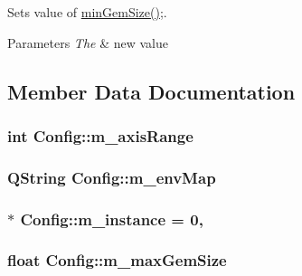 Sets value of \hyperlink{class_config_a26688d51537cbea3ee27810b3f6d1568}{min\+Gem\+Size()};. 


\begin{DoxyParams}{Parameters}
{\em The} & new value \\
\hline
\end{DoxyParams}


\subsection{Member Data Documentation}
\hypertarget{class_config_a5f172b706977841fdcb91351eeae817e}{}
\subsubsection[{m\+\_\+axis\+Range}]{\setlength{\rightskip}{0pt plus 5cm}int Config\+::m\+\_\+axis\+Range\hspace{0.3cm}{\ttfamily [protected]}}\label{class_config_a5f172b706977841fdcb91351eeae817e}
\hypertarget{class_config_a70804accd579749b776f9c0c3e5c000b}{}
\subsubsection[{m\+\_\+env\+Map}]{\setlength{\rightskip}{0pt plus 5cm}Q\+String Config\+::m\+\_\+env\+Map\hspace{0.3cm}{\ttfamily [protected]}}\label{class_config_a70804accd579749b776f9c0c3e5c000b}
\hypertarget{class_config_af8e6282b4a10e5bce08419395394581b}{}
\subsubsection[{m\+\_\+instance}]{ $\ast$ Config\+::m\+\_\+instance = 0\hspace{0.3cm}{\ttfamily [static]}, {\ttfamily [protected]}}\label{class_config_af8e6282b4a10e5bce08419395394581b}
\hypertarget{class_config_ae8a0c3906a4d18952a7fbb00868c963e}{}
\subsubsection[{m\+\_\+max\+Gem\+Size}]{\setlength{\rightskip}{0pt plus 5cm}float Config\+::m\+\_\+max\+Gem\+Size\hspace{0.3cm}{\ttfamily [protected]}}\label{class_config_ae8a0c3906a4d18952a7fbb00868c963e}
\hypertarget{class_config_a7284f245054875419777e7cbad67183c}{}
